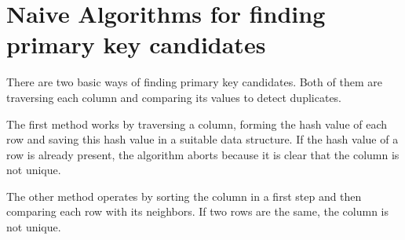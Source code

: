 \section{Naive Algorithms for finding primary key candidates}
There are two basic ways of finding primary key candidates. Both of them are traversing each column and comparing its values to detect duplicates.

The first method works by traversing a column, forming the hash value of each row and saving this hash value in a suitable data structure. If the hash value of a row is already present, the algorithm aborts because it is clear that the column is not unique.

The other method operates by sorting the column in a first step and then comparing each row with its neighbors. If two rows are the same, the column is not unique.
